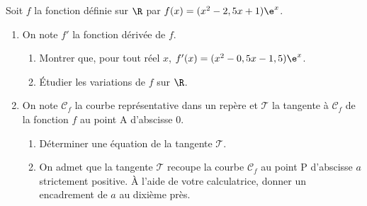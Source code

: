 \medskip

Soit $f$ la fonction définie sur $\R$ par $f(x)=(x^2-2,5x+1) \e^x$.
\begin{enumerate}
\item  On note $f'$ la fonction dérivée de $f$.
\begin{enumerate}
\item  Montrer que, pour tout réel $x$, $f'(x)=(x^2-0,5x-1,5)\e^x$.
\item Étudier les variations de $f$ sur  $\R$.
\end{enumerate}
\item On note $\mathcal{C}_f$ la courbe représentative dans un repère et $\mathcal{T}$ la tangente à $\mathcal{C}_f$ de la fonction $f$ au point A d'abscisse 0.
\begin{enumerate}
\item Déterminer une équation de la tangente $\mathcal{T}$.
\item On admet que la tangente $\mathcal{T}$ recoupe la courbe $\mathcal{C}_f$ au point P d'abscisse $a$ strictement positive. À l'aide de votre calculatrice, donner un encadrement de $a$ au dixième près.
\end{enumerate}
\end{enumerate}

\vspace{0,5cm}
